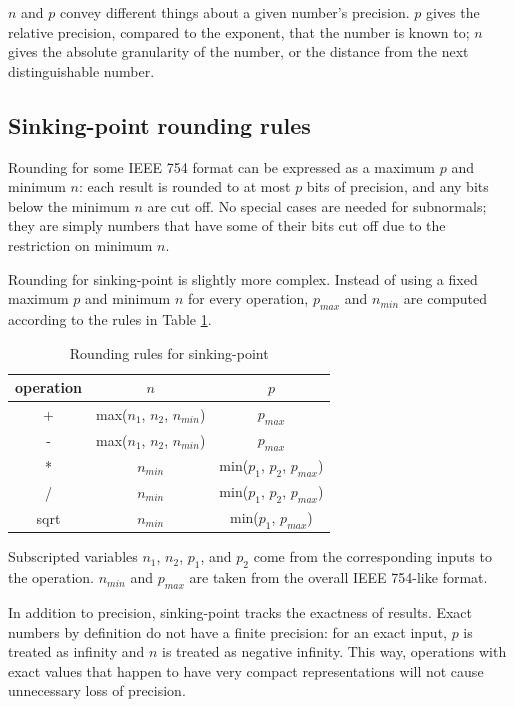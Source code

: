 \documentclass[letterpaper,10pt]{article}
\begin{document}
$n$ and $p$ convey different things about a given number's precision. $p$ gives the relative precision, compared to the exponent, that the number is known to; $n$ gives the absolute granularity of the number, or the distance from the next distinguishable number.

\subsection{Sinking-point rounding rules}

Rounding for some IEEE 754 format can be expressed as a maximum $p$ and minimum $n$: each result is rounded to at most $p$ bits of precision, and any bits below the minimum $n$ are cut off. No special cases are needed for subnormals; they are simply numbers that have some of their bits cut off due to the restriction on minimum $n$.

Rounding for sinking-point is slightly more complex. Instead of using a fixed maximum $p$ and minimum $n$ for every operation, $p_{max}$ and $n_{min}$ are computed according to the rules in Table \ref{tab:rounding}.

\begin{table} 
\begin{center}
\caption{Rounding rules for sinking-point} \label{tab:rounding}
\smallskip
\begin{tabular}{c|c|c}
 operation & $n$ & $p$ \\[5pt]
 \hline
 + & max($n_1$, $n_2$, $n_{min}$) & $p_{max}$ \\[5pt]
 - & max($n_1$, $n_2$, $n_{min}$) & $p_{max}$ \\[5pt]
 * & $n_{min}$ & min($p_1$, $p_2$, $p_{max}$) \\[5pt]
 / & $n_{min}$ & min($p_1$, $p_2$, $p_{max}$) \\[5pt]
 sqrt & $n_{min}$ & min($p_1$, $p_{max}$)
\end{tabular}

\smallskip

Subscripted variables $n_1$, $n_2$, $p_1$, and $p_2$ come from the corresponding inputs to the operation. $n_{min}$ and $p_{max}$ are taken from the overall IEEE 754-like format.
\end{center}
\end{table}

In addition to precision, sinking-point tracks the exactness of results. Exact numbers by definition do not have a finite precision: for an exact input, $p$ is treated as infinity and $n$ is treated as negative infinity. This way, operations with exact values that happen to have very compact representations will not cause unnecessary loss of precision.
\end{document}
